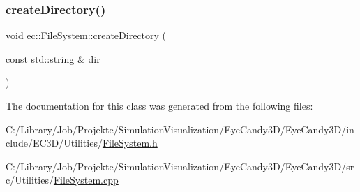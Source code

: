 \subsubsection{\texorpdfstring{create\+Directory()}{createDirectory()}}
{\footnotesize\ttfamily void ec\+::\+File\+System\+::create\+Directory (\begin{DoxyParamCaption}\item[{const std\+::string \&}]{dir }\end{DoxyParamCaption})\hspace{0.3cm}{\ttfamily [static]}}



The documentation for this class was generated from the following files\+:\begin{DoxyCompactItemize}
\item 
C\+:/\+Library/\+Job/\+Projekte/\+Simulation\+Visualization/\+Eye\+Candy3\+D/\+Eye\+Candy3\+D/include/\+E\+C3\+D/\+Utilities/\mbox{\hyperlink{_file_system_8h}{File\+System.\+h}}\item 
C\+:/\+Library/\+Job/\+Projekte/\+Simulation\+Visualization/\+Eye\+Candy3\+D/\+Eye\+Candy3\+D/src/\+Utilities/\mbox{\hyperlink{_file_system_8cpp}{File\+System.\+cpp}}\end{DoxyCompactItemize}

